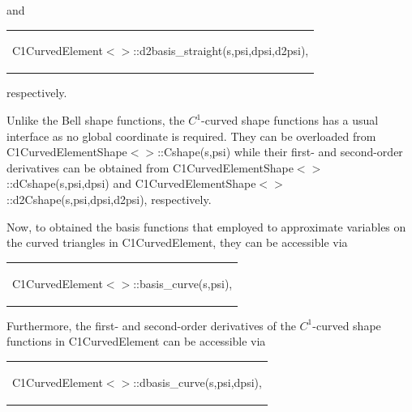 and

\begin{center} \tabulinesep=1mm
\begin{longtabu} spread 0pt [c]{*{1}{|X[-1]}|}
\hline
\begin{center} {\ttfamily C1\+Curved\+Element$<$$>$\+::d2basis\+\_\+straight(s,psi,dpsi,d2psi)}, \end{center}    \\
\end{longtabu}
\end{center}  respectively.

Unlike the Bell shape functions, the $ C^1 $-\/curved shape functions has a usual interface as no global coordinate is required. They can be overloaded from {\ttfamily C1\+Curved\+Element\+Shape$<$$>$\+::\+Cshape(s,psi)} while their first-\/ and second-\/order derivatives can be obtained from {\ttfamily C1\+Curved\+Element\+Shape$<$$>$\+::d\+Cshape(s,psi,dpsi)} and {\ttfamily C1\+Curved\+Element\+Shape$<$$>$\+::d2\+Cshape(s,psi,dpsi,d2psi)}, respectively.

Now, to obtained the basis functions that employed to approximate variables on the curved triangles in {\ttfamily C1\+Curved\+Element}, they can be accessible via

\begin{center} \tabulinesep=1mm
\begin{longtabu} spread 0pt [c]{*{1}{|X[-1]}|}
\hline
\begin{center} {\ttfamily C1\+Curved\+Element$<$$>$\+::basis\+\_\+curve(s,psi)}, \end{center}    \\
\end{longtabu}
\end{center} 

Furthermore, the first-\/ and second-\/order derivatives of the $ C^1 $-\/curved shape functions in {\ttfamily C1\+Curved\+Element} can be accessible via

\begin{center} \tabulinesep=1mm
\begin{longtabu} spread 0pt [c]{*{1}{|X[-1]}|}
\hline
\begin{center} {\ttfamily C1\+Curved\+Element$<$$>$\+::dbasis\+\_\+curve(s,psi,dpsi)}, \end{center}    \\
\end{longtabu}
\end{center} 

